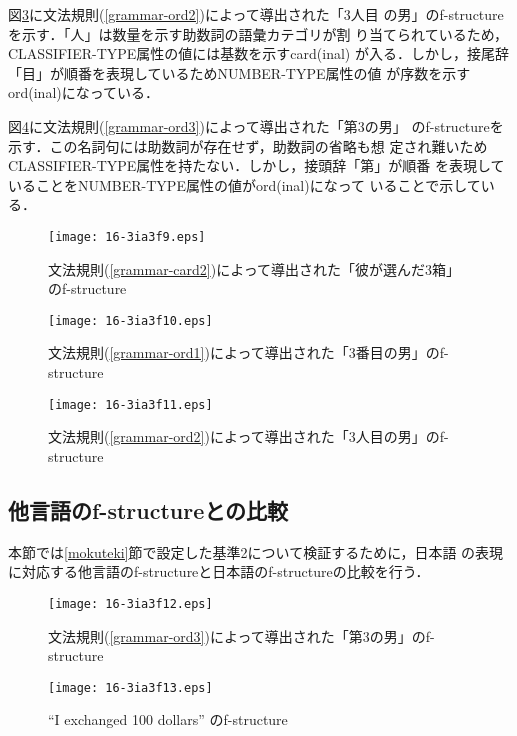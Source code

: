 \documentclass[japanese]{jnlp_1.4}
\begin{document}
図\ref{3ninme}に文法規則(\ref{grammar-ord2})によって導出された「3人目
の男」のf-structureを示す．「人」は数量を示す助数詞の語彙カテゴリが割
り当てられているため，CLASSIFIER-TYPE属性の値には基数を示すcard(inal)
が入る．しかし，接尾辞「目」が順番を表現しているためNUMBER-TYPE属性の値
が序数を示すord(inal)になっている．

図\ref{dai3}に文法規則(\ref{grammar-ord3})によって導出された「第3の男」
のf-structureを示す．この名詞句には助数詞が存在せず，助数詞の省略も想
定され難いためCLASSIFIER-TYPE属性を持たない．しかし，接頭辞「第」が順番
を表現していることをNUMBER-TYPE属性の値がord(inal)になって
いることで示している．

\begin{figure}[t]
\begin{center}
\texttt{[image: 16-3ia3f9.eps]}
\end{center}
\caption{文法規則(\ref{grammar-card2})によって導出された「彼が選んだ3箱」のf-structure}
\label{3box-tandoku}
\end{figure}
\begin{figure}[t]
\begin{center}
\texttt{[image: 16-3ia3f10.eps]}
\end{center}
\caption{文法規則(\ref{grammar-ord1})によって導出された「3番目の男」のf-structure}
\label{3banme}
\end{figure}
\begin{figure}[t]
\begin{center}
\texttt{[image: 16-3ia3f11.eps]}
\end{center}
\caption{文法規則(\ref{grammar-ord2})によって導出された「3人目の男」のf-structure}
\label{3ninme}
\end{figure}




\subsection{他言語のf-structureとの比較\label{fstr-cande}}

本節では\ref{mokuteki}節で設定した基準2について検証するために，日本語
の表現に対応する他言語のf-structureと日本語のf-structureの比較を行う．

\begin{figure}[t]
\begin{center}
\texttt{[image: 16-3ia3f12.eps]}
\end{center}
\caption{文法規則(\ref{grammar-ord3})によって導出された「第3の男」のf-structure}
\label{dai3}
\end{figure}
\begin{figure}[t]
\begin{center}
\texttt{[image: 16-3ia3f13.eps]}
\end{center}
\caption{``I exchanged 100 dollars'' のf-structure}
\label{currency-e}
\end{figure}
\end{document}
